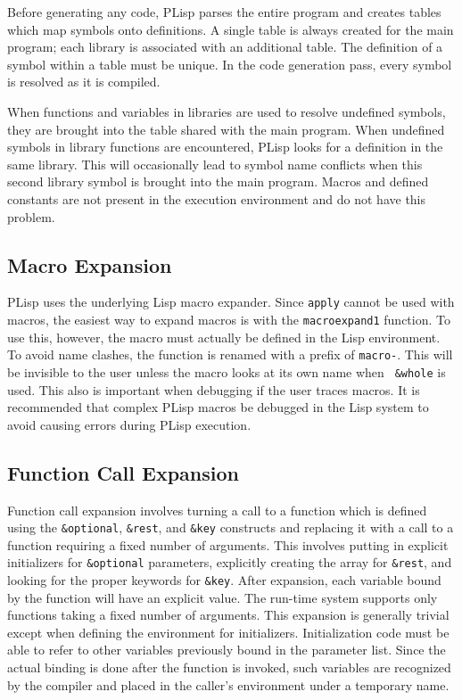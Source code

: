 Before generating any code, PLisp parses the entire program and creates tables
which map symbols onto definitions.  A single table is always created for the
main program; each library is associated with an additional table.
The definition of a symbol within a table must be unique.  In the code
generation pass, every symbol is resolved as it is compiled.

When functions and variables in libraries are used to resolve undefined
symbols, they are brought into the table shared with the main program.
When undefined symbols in library functions are encountered, PLisp
looks for a definition in the same library.  This will occasionally
lead to symbol name conflicts when this second library symbol is
brought into the main program.
Macros and defined constants are not
present in the execution environment and do not have this problem.

\subsection{Macro Expansion}
PLisp uses the underlying Lisp macro expander.  Since {\tt apply}
cannot be used with macros, the easiest way to expand macros is with
the {\tt macroexpand1} function.  To use this, however, the macro must
actually be defined in the Lisp environment.  To avoid name clashes,
the function is renamed with a prefix of {\tt macro-}.  This will be
invisible to the user unless the macro looks at its own name when {\tt
\&whole} is used.  This also is
important when debugging if the user traces macros.  It is recommended
that complex PLisp macros be debugged in the Lisp system to avoid
causing errors during PLisp execution.

\subsection {Function Call Expansion}
Function call expansion involves turning a call to a function which
is defined using the {\tt \&optional}, {\tt \&rest},
and {\tt \&key} constructs and replacing it with a call to a function
requiring a fixed number of arguments.  This involves putting in
explicit initializers for {\tt \&optional} parameters, explicitly
creating the array for {\tt \&rest}, and looking for the proper
keywords for {\tt \&key}.  After expansion, each variable bound by the
function will have an explicit value.  The run-time system supports
only functions taking a fixed number of arguments.  This expansion is
generally trivial except when defining the environment for
initializers.  Initialization code must be able to refer to other
variables previously bound in the parameter list.  Since the actual
binding is done after the function is invoked, such variables are
recognized by the compiler and placed in the caller's environment
under a temporary name.

